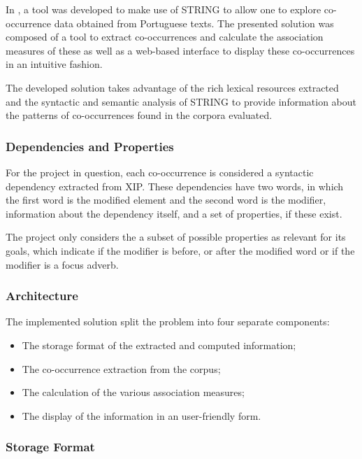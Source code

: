 In \cite{correia2015syntax}, a tool was developed to make use of \ac{STRING} to
allow one to explore co-occurrence data obtained from Portuguese texts. The
presented solution was composed of a tool to extract co-occurrences and
calculate the association measures of these as well as a web-based interface to
display these co-occurrences in an intuitive fashion.

The developed solution takes advantage of the rich lexical resources extracted
and the syntactic and semantic analysis of \ac{STRING} to provide information
about the patterns of co-occurrences found in the corpora evaluated.

\subsubsection*{Dependencies and Properties}

For the project in question, each co-occurrence is considered a syntactic
dependency extracted from \ac{XIP}. These dependencies have two words, in which
the first word is the modified element and the second word is the modifier,
information about the dependency itself, and a set of properties, if these
exist.

The project only considers the a subset of possible properties as relevant for
its goals, which indicate if the modifier is before, or after the modified word
or if the modifier is a focus adverb.


\subsubsection*{Architecture}

The implemented solution split the problem into four separate components:

\begin{itemize}
 \item The storage format of the extracted and computed information;
 \item The co-occurrence extraction from the corpus;
 \item The calculation of the various association measures;
 \item The display of the information in an user-friendly form.
\end{itemize}

\subsubsection*{Storage Format}

